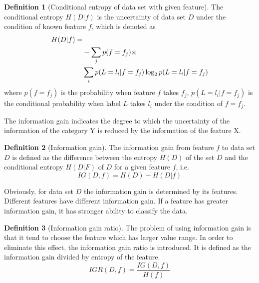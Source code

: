 \documentclass{ieeeaccess}
\theoremstyle{definition}
\newtheorem{defn}{Definition}
\begin{document}
\begin{defn}[Conditional entropy of data set with given feature]
The conditional entropy $H(D|f)$ is the uncertainty of data set $D$ under the condition of known feature $f$, which is denoted as 
\begin{align}
     H(D|f)= & \notag \\
    & -\sum_{j} p(f=f_j) \times \notag \\
    & \sum_{i} p(L=l_i|f=f_j) \log_2 p(L=l_i|f=f_j)   
\end{align}
where $p(f=f_j)$ is the probability when feature $f$ takes $f_j$, $p(L=l_i | f=f_j)$ is the conditional probability when label $L$ takes $l_i$ under the condition of $f=f_j$.
\end{defn}

The information gain indicates the degree to which the uncertainty of the information of the category Y is reduced by the information of the feature X.

\begin{defn}[Information gain]
    The information gain from feature $f$ to data set $D$ is defined as the difference between the entropy $H(D)$ of the set $D$ and the conditional entropy $H(D|F)$ of $D$ for a given feature $f$, i.e.
\begin{equation}
    IG(D, f) = H(D) - H(D|f)
\end{equation}
\end{defn}

Obviously, for data set $D$ the information gain is determined by its features. Different features have different information gain. If a feature has greater information gain, it has stronger ability to classify the data.

\begin{defn}[Information gain ratio]
The problem of using information gain is that it tend to choose the feature which has larger value range. In order to eliminate this effect, the information gain ratio is introduced. It is defined as the information gain divided by entropy of the feature. 
\begin{equation}
    IGR(D, f) = \frac{IG(D, f)}{H(f)}
\end{equation}
\end{defn}
\end{document}
